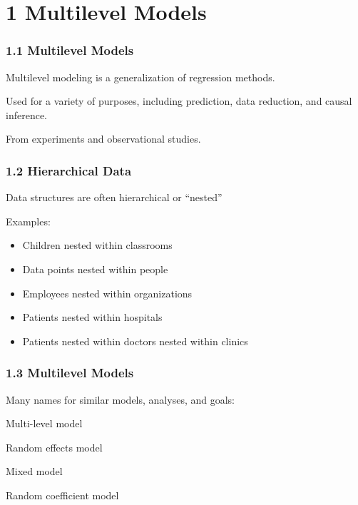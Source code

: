 \documentclass[
]{article}
\author{}
\date{\vspace{-2.5em}}
\providecommand{\tightlist}{%
  \setlength{\itemsep}{0pt}\setlength{\parskip}{0pt}}
\begin{document}
{
\setcounter{tocdepth}{3}
\tableofcontents
}
\hypertarget{multilevel-models}{%
\section{1 Multilevel Models}\label{multilevel-models}}

\hypertarget{multilevel-models-1}{%
\subsubsection{1.1 Multilevel Models}\label{multilevel-models-1}}

Multilevel modeling is a generalization of regression methods.

Used for a variety of purposes, including prediction, data reduction,
and causal inference.

From experiments and observational studies.

\hypertarget{hierarchical-data}{%
\subsubsection{1.2 Hierarchical Data}\label{hierarchical-data}}

Data structures are often hierarchical or ``nested''

Examples:

\begin{itemize}
\tightlist
\item
  Children nested within classrooms
\item
  Data points nested within people
\item
  Employees nested within organizations
\item
  Patients nested within hospitals
\item
  Patients nested within doctors nested within clinics
\end{itemize}

\hypertarget{multilevel-models-2}{%
\subsubsection{1.3 Multilevel Models}\label{multilevel-models-2}}

Many names for similar models, analyses, and goals:

Multi-level model

Random effects model

Mixed model

Random coefficient model
\end{document}
